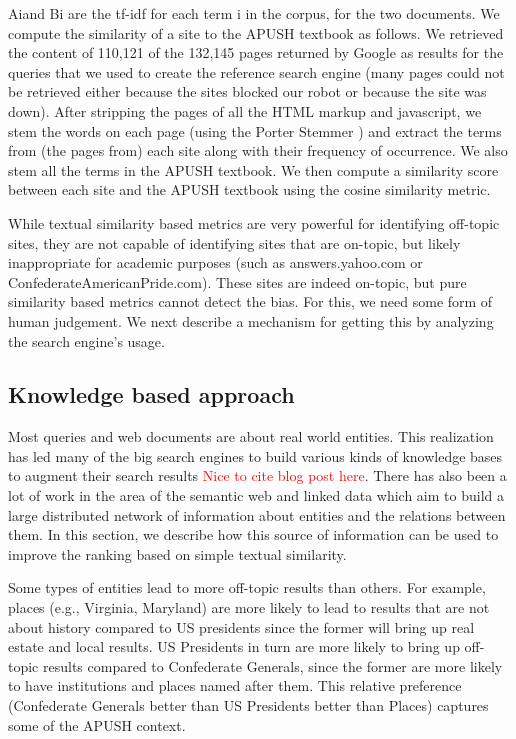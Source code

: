 \documentclass[pdfpagelabels=false,plainpages=true]{acm_proc_article-sp}
\begin{document}
Aiand Bi are the tf-idf for each term i in the corpus, for the two documents. We
compute the similarity of a site to the APUSH textbook as follows. We retrieved
the content of 110,121 of the 132,145 pages returned by Google as results for
the queries that we used to create the reference search engine (many pages could
not be retrieved either because the sites blocked our robot or because the site
was down). After stripping the pages of all the HTML markup and javascript, we
stem the words on each page (using the Porter Stemmer
\cite{porter1980algorithm}) and extract the terms from (the pages from) each
site along with their frequency of occurrence. We also stem all the terms in the
APUSH textbook. We then compute a similarity score between each site and the
APUSH textbook using the cosine similarity metric.

While textual similarity based metrics are very powerful for identifying
off-topic sites, they are not capable of identifying sites that are on-topic,
but likely inappropriate for academic purposes (such as answers.yahoo.com or
ConfederateAmericanPride.com). These sites are indeed on-topic, but pure
similarity based metrics cannot detect the bias. For this, we need some form of
human judgement. We next describe a mechanism for getting this by analyzing the
search engine's usage. 

\subsection{Knowledge based approach}

Most queries and web documents are about real world entities.  This realization
has led many of the big search engines to build various kinds of knowledge
bases to augment their search results \textcolor{red}{Nice to cite blog post
  here}. There has also been a lot of work in the area of the semantic web
and linked data \cite{berners2001semantic,bizer2008linked} which aim to build a
large distributed network of information about entities and the relations
between them. In this section, we describe how this source of information can be
used to improve the ranking based on simple textual similarity.  

Some types of entities lead to more off-topic results than others. For example,
places (e.g., Virginia, Maryland) are more likely to lead to results that are
not about history compared to US presidents since the former will bring up real
estate and local results. US Presidents in turn are more likely to bring up
off-topic results compared to Confederate Generals, since the former are more
likely to have institutions and places named after them. This relative preference
(Confederate Generals better than US Presidents better than Places) captures
some of the APUSH context. 
\end{document}
